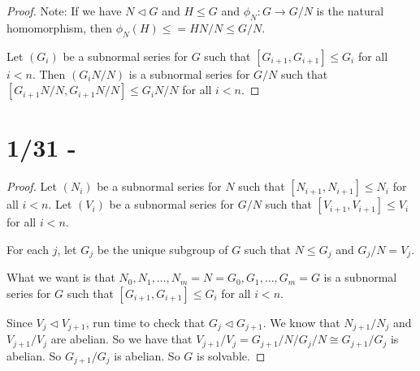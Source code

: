 \documentclass{report}
\begin{document}
\begin{proof}
    Note: If we have $N \lhd G$ and $H \leq G$ and $\phi_N : G \to G/N$ is the natural homomorphism, then $\phi_N(H) \leq  = HN/N \leq G/N$.

    Let $(G_i)$ be a subnormal series for $G$ such that $[G_{i+1}, G_{i+1}] \leq G_i$ for all $i < n$. Then $(G_iN/N)$ is a subnormal series for $G/N$ such that $[G_{i+1}N/N, G_{i+1}N/N] \leq G_iN/N$ for all $i < n$.
\end{proof}

\section{1/31 - }
\begin{proof}
    Let $(N_i)$ be a subnormal series for $N$ such that $[N_{i+1}, N_{i+1}] \leq N_i$ for all $i < n$. Let $(V_i)$ be a subnormal series for $G/N$ such that $[V_{i+1}, V_{i+1}] \leq V_i$ for all $i < n$.

    For each $j$, let $G_j$ be the unique subgroup of $G$ such that $N \leq G_j$ and $G_j/N = V_j$. 

    What we want is that $N_0, N_1, \ldots, N_m = N = G_0, G_1, \ldots, G_m = G$ is a subnormal series for $G$ such that $[G_{i+1}, G_{i+1}] \leq G_i$ for all $i < n$.

    Since $V_j \lhd V_{j+1}$, run time to check that $G_j \lhd G_{j+1}$. We know that $N_{j+1} / N_j$ and $V_{j+1} / V_j$ are abelian. So we have that $V_{j+1} / V_j = G_{j+1} / N / G_j / N \cong G_{j+1} / G_j$ is abelian. So $G_{j+1} / G_j$ is abelian. So $G$ is solvable.
\end{proof}

\end{document}
